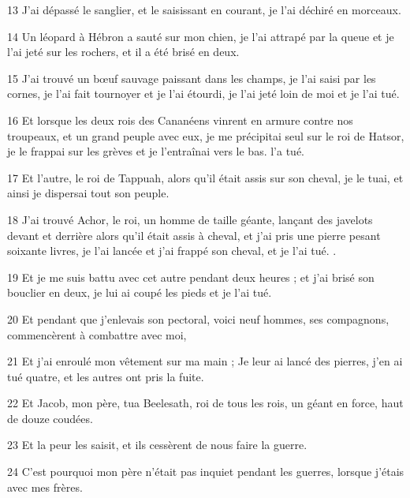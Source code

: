 \par 13 J'ai dépassé le sanglier, et le saisissant en courant, je l'ai déchiré en morceaux.

\par 14 Un léopard à Hébron a sauté sur mon chien, je l'ai attrapé par la queue et je l'ai jeté sur les rochers, et il a été brisé en deux.

\par 15 J'ai trouvé un bœuf sauvage paissant dans les champs, je l'ai saisi par les cornes, je l'ai fait tournoyer et je l'ai étourdi, je l'ai jeté loin de moi et je l'ai tué.

\par 16 Et lorsque les deux rois des Cananéens vinrent en armure contre nos troupeaux, et un grand peuple avec eux, je me précipitai seul sur le roi de Hatsor, je le frappai sur les grèves et je l'entraînai vers le bas. l'a tué.

\par 17 Et l'autre, le roi de Tappuah, alors qu'il était assis sur son cheval, je le tuai, et ainsi je dispersai tout son peuple.

\par 18 J'ai trouvé Achor, le roi, un homme de taille géante, lançant des javelots devant et derrière alors qu'il était assis à cheval, et j'ai pris une pierre pesant soixante livres, je l'ai lancée et j'ai frappé son cheval, et je l'ai tué. .

\par 19 Et je me suis battu avec cet autre pendant deux heures ; et j'ai brisé son bouclier en deux, je lui ai coupé les pieds et je l'ai tué.

\par 20 Et pendant que j'enlevais son pectoral, voici neuf hommes, ses compagnons, commencèrent à combattre avec moi,

\par 21 Et j'ai enroulé mon vêtement sur ma main ; Je leur ai lancé des pierres, j'en ai tué quatre, et les autres ont pris la fuite.

\par 22 Et Jacob, mon père, tua Beelesath, roi de tous les rois, un géant en force, haut de douze coudées.

\par 23 Et la peur les saisit, et ils cessèrent de nous faire la guerre.

\par 24 C'est pourquoi mon père n'était pas inquiet pendant les guerres, lorsque j'étais avec mes frères.

